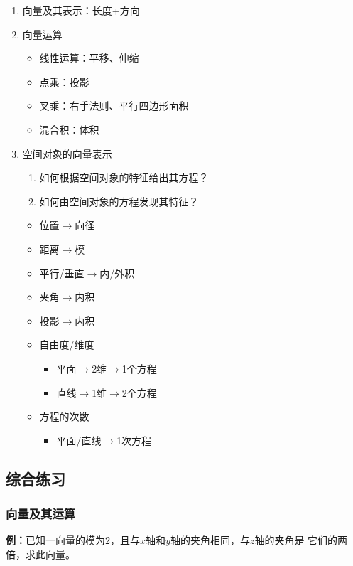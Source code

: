 \begin{enumerate}
  \item 向量及其表示：长度+方向
  \item 向量运算
  \begin{itemize}
    \item 线性运算：平移、伸缩
    \item 点乘：投影
    \item 叉乘：右手法则、平行四边形面积
    \item 混合积：体积
  \end{itemize}
  \item 空间对象的向量表示
  \begin{enumerate}
	\item 如何根据空间对象的特征给出其方程？ 
	\item 如何由空间对象的方程发现其特征？ 
  \end{enumerate}
  \begin{itemize}
	\item 位置$\to$向径 
	\item 距离$\to$模 
	\item 平行/垂直$\to$内/外积 
	\item 夹角$\to$内积 
	\item 投影$\to$内积 
	\item 自由度/维度 
    \begin{itemize}
      \item 平面$\to$2维$\to$1个方程
      \item 直线$\to$1维$\to$2个方程
    \end{itemize}
    \item 方程的次数
    \begin{itemize}
      \item 平面/直线$\to$1次方程
    \end{itemize}
  \end{itemize}
\end{enumerate}

\subsection{综合练习}

\subsubsection{向量及其运算}

{\bf 例：}已知一向量的模为$2$，且与$x$轴和$y$轴的夹角相同，与$z$轴的夹角是
它们的两倍，求此向量。

